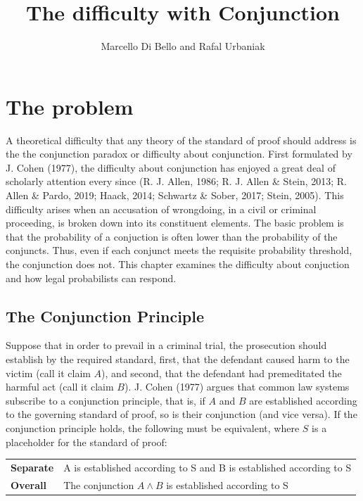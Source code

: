 \documentclass[10pt,dvipsnames,enabledeprecatedfontcommands]{scrartcl}
\title{The difficulty with Conjunction}
\author{Marcello Di Bello and Rafal Urbaniak}
\date{}
\newcommand{\et}{\wedge}
\begin{document}
\maketitle

\tableofcontents

\section{The problem}\label{the-problem}

A theoretical difficulty that any theory of the standard of proof should
address is the the conjunction paradox or difficulty about conjunction.
First formulated by J. Cohen (1977), the difficulty about conjunction
has enjoyed a great deal of scholarly attention every since (R. J.
Allen, 1986; R. J. Allen \& Stein, 2013; R. Allen \& Pardo, 2019; Haack,
2014; Schwartz \& Sober, 2017; Stein, 2005). This difficulty arises when
an accusation of wrongdoing, in a civil or criminal proceeding, is
broken down into its constituent elements. The basic problem is that the
probability of a conjuction is often lower than the probability of the
conjuncts. Thus, even if each conjunct meets the requisite probability
threshold, the conjunction does not. This chapter examines the
difficulty about conjuction and how legal probabilists can respond.

\subsection{The Conjunction Principle}\label{the-conjunction-principle}

Suppose that in order to prevail in a criminal trial, the prosecution
should establish by the required standard, first, that the defendant
caused harm to the victim (call it claim \(A\)), and second, that the
defendant had premeditated the harmful act (call it claim \(B\)). J.
Cohen (1977) argues that common law systems subscribe to a conjunction
principle, that is, if \(A\) and \(B\) are established according to the
governing standard of proof, so is their conjunction (and vice versa).
If the conjunction principle holds, the following must be equivalent,
where \(S\) is a placeholder for the standard of proof:

\begin{center}
\begin{tabular}
{@{}ll@{}}
\toprule
\textbf{Separate} &   A is established according to S and B is established according to S\\   
\textbf{Overall}  &   The conjunction $A \et B$ is established according to S  \\ 
\bottomrule
\end{tabular}
\end{center}
\end{document}
